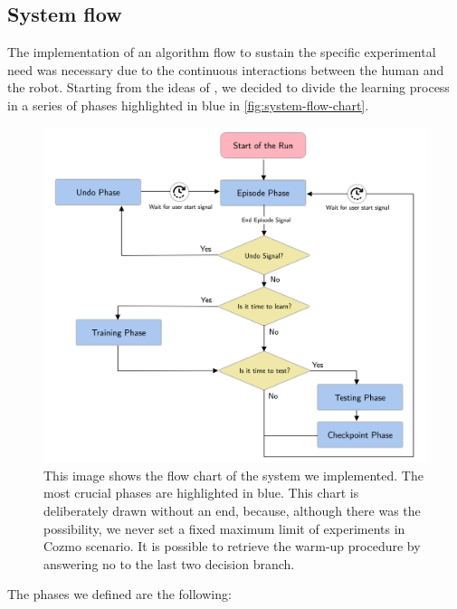 \subsection{System flow} \label{subsec:system-flow}

The implementation of an algorithm flow to sustain the specific experimental need was necessary due to the continuous interactions between the human and the robot.
Starting from the ideas of \cite{kendall2018learning,kendall2019learning}, we decided to divide the learning process in a series of phases highlighted in blue in \vref{fig:system-flow-chart}.

\begin{figure}
    \centering
    \includegraphics[width=\textwidth]{img/system-flow.png}
    \caption[Cozmo algorithm flow chart]{This image shows the flow chart of the system we implemented.
        The most crucial phases are highlighted in blue.
        This chart is deliberately drawn without an end, because, although there was the possibility, we never set a fixed maximum limit of experiments in Cozmo scenario.
        It is possible to retrieve the warm-up procedure by answering no to the last two decision branch.}
    \label{fig:system-flow-chart}
\end{figure}

The phases we defined are the following:

